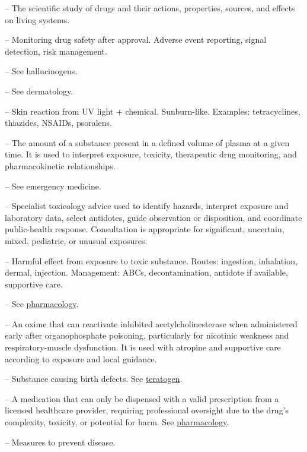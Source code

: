 -- The scientific study of drugs and their actions, properties, sources, and effects on living systems.

-- Monitoring drug safety after approval. Adverse event reporting, signal detection, risk management.

-- See hallucinogens.

-- See dermatology.

-- Skin reaction from UV light + chemical. Sunburn-like. Examples: tetracyclines, thiazides, NSAIDs, psoralens.

-- The amount of a substance present in a defined volume of plasma at a given time. It is used to interpret exposure, toxicity, therapeutic drug monitoring, and pharmacokinetic relationships.

-- See emergency medicine.

-- Specialist toxicology advice used to identify hazards, interpret exposure and laboratory data, select antidotes, guide observation or disposition, and coordinate public-health response. Consultation is appropriate for significant, uncertain, mixed, pediatric, or unusual exposures.

-- Harmful effect from exposure to toxic substance. Routes: ingestion, inhalation, dermal, injection. Management: ABCs, decontamination, antidote if available, supportive care.

-- See \hyperlink{Pharmacology}{pharmacology}.

-- An oxime that can reactivate inhibited acetylcholinesterase when administered early after organophosphate poisoning, particularly for nicotinic weakness and respiratory-muscle dysfunction. It is used with atropine and supportive care according to exposure and local guidance.

-- Substance causing birth defects. See \hyperlink{Teratogen}{teratogen}.

-- A medication that can only be dispensed with a valid prescription from a licensed healthcare provider, requiring professional oversight due to the drug's complexity, toxicity, or potential for harm. See \hyperlink{Pharmacology}{pharmacology}.

-- Measures to prevent disease.

